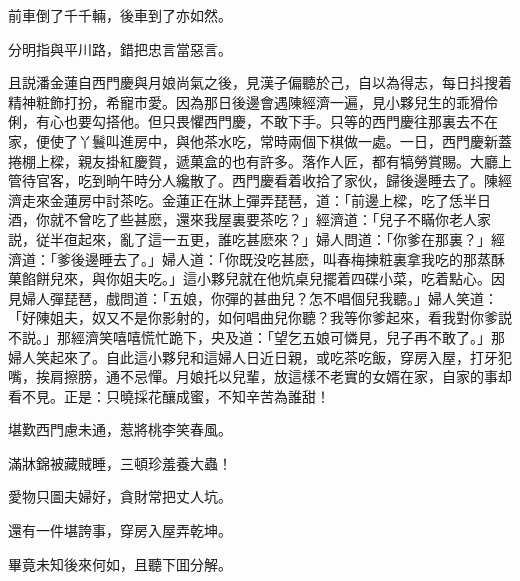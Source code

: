 \begin{myquote}
前車倒了千千輛，後車到了亦如然。

分明指與平川路，錯把忠言當惡言。
\end{myquote}

且説潘金蓮自西門慶與月娘尚氣之後，見漢子偏聽於己，自以為得志，每日抖搜着精神粧飾打扮，希寵巿愛。因為那日後邊會遇陳經濟一遍，見小夥兒生的乖猾伶俐，有心也要勾搭他。但只畏懼西門慶，不敢下手。只等的西門慶往那裏去不在家，便使了丫鬟叫進房中，與他茶水吃，常時兩個下棋做一處。一日，西門慶新蓋捲棚上樑，親友掛紅慶賀，遞菓盒的也有許多。落作人匠，都有犒勞賞賜。大廳上管待官客，吃到晌午時分人纔散了。西門慶看着收拾了家伙，歸後邊睡去了。陳經濟走來金蓮房中討茶吃。金蓮正在牀上彈弄琵琶，道：「前邊上樑，吃了恁半日酒，你就不曾吃了些甚麽，還來我屋裏要茶吃？」經濟道：「兒子不瞞你老人家説，従半亱起來，亂了這一五更，誰吃甚麽來？」婦人問道：「你爹在那裏？」經濟道：「爹後邊睡去了。」婦人道：「你既没吃甚麽，叫春梅揀粧裏拿我吃的那蒸酥菓餡餅兒來，與你姐夫吃。」這小夥兒就在他炕桌兒擺着四碟小菜，吃着點心。因見婦人彈琵琶，戲問道：「五娘，你彈的甚曲兒？怎不唱個兒我聽。」婦人笑道：「好陳姐夫，奴又不是你影射的，如何唱曲兒你聽？我等你爹起來，看我對你爹説不説。」那經濟笑嘻嘻慌忙跪下，央及道：「望乞五娘可憐見，兒子再不敢了。」那婦人笑起來了。自此這小夥兒和這婦人日近日親，或吃茶吃飯，穿房入屋，打牙犯嘴，挨肩擦膀，通不忌憚。月娘托以兒輩，放這樣不老實的女婿在家，自家的事却看不見。正是：只曉採花釀成蜜，不知辛苦為誰甜！

\begin{myquote}
堪歎西門慮未通，惹將桃李笑春風。

滿牀錦被藏賊睡，三頓珍羞養大蟲！

愛物只圖夫婦好，貪財常把丈人坑。

還有一件堪誇事，穿房入屋弄乾坤。
\end{myquote}

畢竟未知後來何如，且聽下囬分解。

